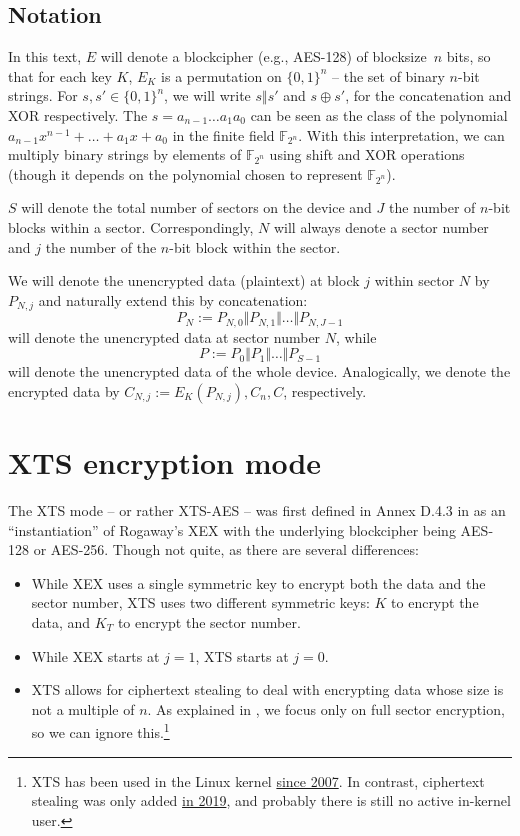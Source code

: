 \documentclass[a4paper]{article}
\begin{document}
\subsection{Notation}
In this text, $E$ will denote a blockcipher (e.g., AES-128) of blocksize~$n$ bits, so that for each key $K$, $E_K$ is a permutation on $\{0,1\}^n$ -- the set of binary $n$-bit strings. For $s,s'\in \{0,1\}^n$, we will write $s \Vert s'$ and $s \oplus s'$, for the concatenation and XOR respectively. 
The $s = a_{n-1}\dots a_1 a_0$ can be seen as the class of the polynomial $a_{n-1}x^{n-1} + \dots + a_1x + a_0$ in the finite field $\mathbb{F}_{2^n}$. With this interpretation, we can multiply binary strings by elements of $\mathbb{F}_{2^n}$ using shift and XOR operations (though it depends on the polynomial chosen to represent $\mathbb{F}_{2^n}$).

$S$ will denote the total number of sectors on the device and $J$ the number of $n$-bit blocks within a sector. Correspondingly, $N$ will always denote a sector number and $j$ the number of the $n$-bit block within the sector.

We will denote the unencrypted data (plaintext) at block $j$ within sector $N$ by $P_{N,j}$ and naturally extend this by concatenation:
$$P_N := P_{N,0} \Vert P_{N,1} \Vert \dots \Vert P_{N,J-1}$$
will denote the unencrypted data at sector number $N$, while 
$$P := P_0 \Vert P_1 \Vert \dots \Vert P_{S-1}$$
will denote the unencrypted data of the whole device. Analogically, we denote the encrypted data by $C_{N,j}:=E_K(P_{N,j}), C_n, C$, respectively.

\section{XTS encryption mode}
The XTS mode -- or rather XTS-AES -- was first defined in Annex D.4.3 in \cite{IEEE1619-2018} as an ``instantiation'' of Rogaway's XEX \cite{rogaway2004efficient} with the underlying blockcipher being AES-128 or
AES-256. Though not quite, as there are several differences:
\begin{itemize}
    \item While XEX uses a single symmetric key to encrypt both the data and the sector number, XTS uses two different symmetric keys: $K$ to encrypt the data, and $K_T$ to encrypt the sector number.
    \item While XEX starts at $j=1$, XTS starts at $j=0$.
    \item XTS allows for ciphertext stealing to deal with encrypting data whose size is not a multiple of $n$. As explained in , we focus only on full sector encryption, so we can ignore this.\footnote{XTS has been used 
    in the Linux kernel \href{https://git.kernel.org/pub/scm/linux/kernel/git/torvalds/linux.git/commit/crypto/xts.c?id=f19f5111c94053ba4931892f5c01c806de33942e}{since 2007}. 
    In contrast, ciphertext stealing was only added \href{https://git.kernel.org/pub/scm/linux/kernel/git/torvalds/linux.git/commit/crypto/xts.c?id=8083b1bf8163e7ae7d8c90f221106d96450b8aa8}{in 2019}, 
    and probably there is still no active in-kernel user. 
    }
\end{itemize}
\end{document}
